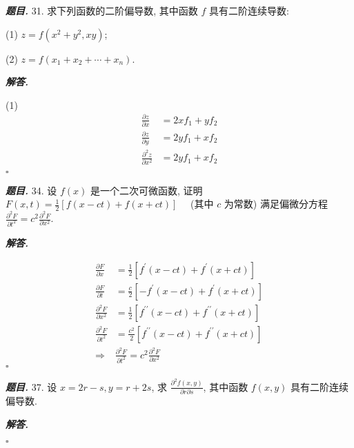 \documentclass[10pt, a4paper, oneside]{ctexart}
\newenvironment{problem}{\begin{framed}\par\noindent\textbf{\textit{题目. }}}{\end{framed}\par}
\newenvironment{solution}{%
  \par\noindent\textbf{\textit{解答. }}\ignorespaces
}{%
  \hfill\ensuremath{\square}\par %
}
\begin{document}
\begin{problem}
    31. 求下列函数的二阶偏导数, 其中函数 $f$ 具有二阶连续导数:

    (1) $z=f\left(x^2+y^2, x y\right)$;

    (2) $z=f\left(x_1+x_2+\cdots+x_n\right)$.
\end{problem}
\begin{solution}
(1)
\begin{align*}
\frac{\partial z}{\partial x}&=2xf_1+yf_2\\
\frac{\partial z}{\partial y}&=2yf_1+xf_2\\
\frac{\partial^2 z}{\partial x^2}&=2yf_1+xf_2\\
\end{align*}
\end{solution}

\begin{problem}
34. 设 $f(x)$ 是一个二次可微函数, 证明
    $F(x, t)=\frac{1}{2}[f(x-c t)+f(x+c t)] \quad$ (其中 $c$ 为常数)
    满足偏微分方程 $\frac{\partial^2 F}{\partial t^2}=c^2 \frac{\partial^2 F}{\partial x^2}$.
\end{problem}
\begin{solution}
    \begin{align*}
        \frac{\partial F}{\partial x}&=\frac{1}{2}[f^{\prime}(x-ct)+f^{\prime}(x+ct)]\\ 
        \frac{\partial F}{\partial t}&=\frac{c}{2}[-f^{\prime}(x-ct)+f^{\prime}(x+ct)]\\ 
        \frac{\partial^2 F}{\partial x^2}&=\frac{1}{2}[f^{\prime\prime}(x-ct)+f^{\prime\prime}(x+ct)]\\ 
        \frac{\partial^2 F}{\partial t^2}&=\frac{c^2}{2}[f^{\prime\prime}(x-ct)+f^{\prime\prime}(x+ct)]\\ 
        \Rightarrow& \frac{\partial^2 F}{\partial t^2}=c^2\frac{\partial^2 F}{\partial x^2}
    \end{align*}
\end{solution}

\begin{problem}
    37. 设 $x=2 r-s, y=r+2 s$, 求 $\frac{\partial^2 f(x, y)}{\partial r \partial s}$, 其中函数 $f(x, y)$ 具有二阶连续偏导数.
\end{problem}
\begin{solution}
    
\end{solution}
\end{document}
